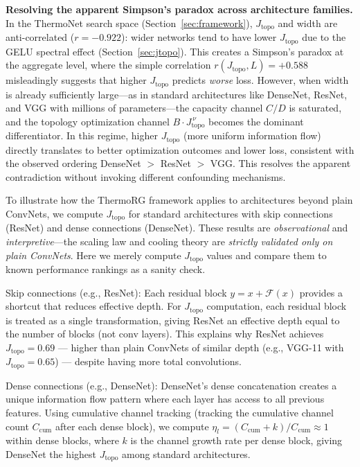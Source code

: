 \documentclass[11pt, a4paper]{article}
\theoremstyle{plain}
\def\ca#1{{\mathcal #1}}
\begin{document}
\textbf{Resolving the apparent Simpson's paradox across architecture families.}
In the ThermoNet search space (Section~\ref{sec:framework}), $J_{\mathrm{topo}}$ and width are anti-correlated ($r = -0.922$): wider networks tend to have lower $J_{\mathrm{topo}}$ due to the GELU spectral effect (Section~\ref{sec:jtopo}). This creates a Simpson's paradox at the aggregate level, where the simple correlation $r(J_{\mathrm{topo}}, L) = +0.588$ misleadingly suggests that higher $J_{\mathrm{topo}}$ predicts \emph{worse} loss. However, when width is already sufficiently large---as in standard architectures like DenseNet, ResNet, and VGG with millions of parameters---the capacity channel $C/D$ is saturated, and the topology optimization channel $B \cdot J_{\mathrm{topo}}^{\,\nu}$ becomes the dominant differentiator. In this regime, higher $J_{\mathrm{topo}}$ (more uniform information flow) directly translates to better optimization outcomes and lower loss, consistent with the observed ordering DenseNet $>$ ResNet $>$ VGG. This resolves the apparent contradiction without invoking different confounding mechanisms.

To illustrate how the ThermoRG framework applies to architectures beyond plain ConvNets, we compute $J_{\mathrm{topo}}$ for standard architectures with skip connections (ResNet) and dense connections (DenseNet). These results are \emph{observational} and \emph{interpretive}---the scaling law and cooling theory are \emph{strictly validated only on plain ConvNets}. Here we merely compute $J_{\mathrm{topo}}$ values and compare them to known performance rankings as a sanity check.

Skip connections (e.g., ResNet): Each residual block $y = x + \ca{F}(x)$ provides a shortcut that reduces effective depth. For $J_{\mathrm{topo}}$ computation, each residual block is treated as a single transformation, giving ResNet an effective depth equal to the number of blocks (not conv layers). This explains why ResNet achieves $J_{\mathrm{topo}} = 0.69$ --- higher than plain ConvNets of similar depth (e.g., VGG-11 with $J_{\mathrm{topo}}=0.65$) --- despite having more total convolutions.

Dense connections (e.g., DenseNet): DenseNet's dense concatenation creates a unique information flow pattern where each layer has access to all previous features. Using cumulative channel tracking (tracking the cumulative channel count $C_{\mathrm{cum}}$ after each dense block), we compute $\eta_l = (C_{\mathrm{cum}} + k) / C_{\mathrm{cum}} \approx 1$ within dense blocks, where $k$ is the channel growth rate per dense block, giving DenseNet the highest $J_{\mathrm{topo}}$ among standard architectures.
\end{document}
